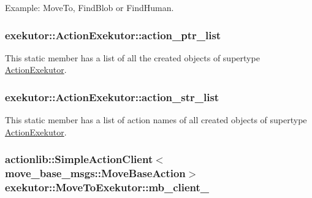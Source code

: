 \-Example\-: \-Move\-To, \-Find\-Blob or \-Find\-Human. \hypertarget{classexekutor_1_1ActionExekutor_a73c4f2607b0725f5b201cf501cb42578}{
\subsubsection[{action\-\_\-ptr\-\_\-list}]{ {\bf exekutor\-::\-Action\-Exekutor\-::action\-\_\-ptr\-\_\-list}}}\label{classexekutor_1_1ActionExekutor_a73c4f2607b0725f5b201cf501cb42578}


\-This static member has a list of all the created objects of supertype \hyperlink{classexekutor_1_1ActionExekutor}{\-Action\-Exekutor}. 

\hypertarget{classexekutor_1_1ActionExekutor_a0dc39a7a2a3a67d2bdd366f9e6e682a2}{
\subsubsection[{action\-\_\-str\-\_\-list}]{ {\bf exekutor\-::\-Action\-Exekutor\-::action\-\_\-str\-\_\-list}}}\label{classexekutor_1_1ActionExekutor_a0dc39a7a2a3a67d2bdd366f9e6e682a2}


\-This static member has a list of action names of all created objects of supertype \hyperlink{classexekutor_1_1ActionExekutor}{\-Action\-Exekutor}. 

\hypertarget{classexekutor_1_1MoveToExekutor_a8327c7f44d63874c74a3e2cd44a6c77a}{
\subsubsection[{mb\-\_\-client\-\_\-}]{\setlength{\rightskip}{0pt plus 5cm}actionlib\-::\-Simple\-Action\-Client$<$move\-\_\-base\-\_\-msgs\-::\-Move\-Base\-Action$>$ {\bf exekutor\-::\-Move\-To\-Exekutor\-::mb\-\_\-client\-\_\-}}}\label{classexekutor_1_1MoveToExekutor_a8327c7f44d63874c74a3e2cd44a6c77a}



